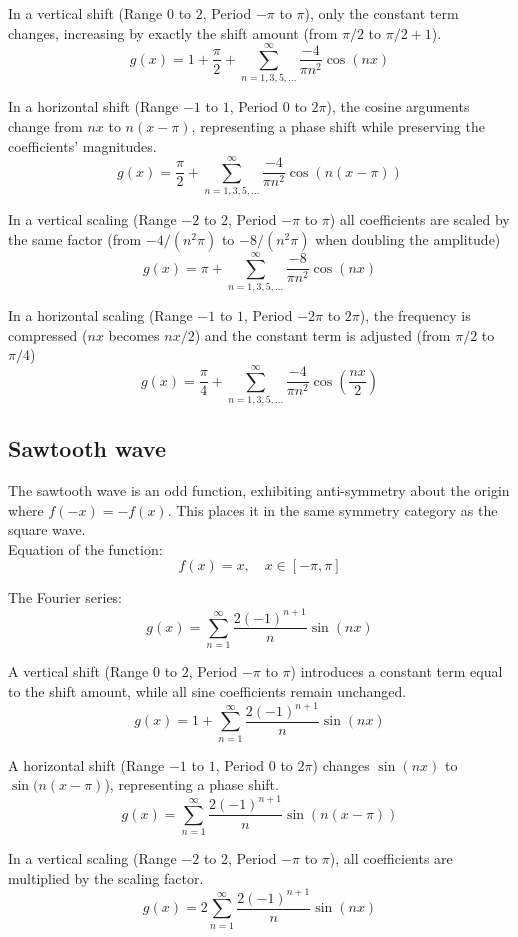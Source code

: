 \documentclass{article}
\begin{document}
In a vertical shift (Range $0$ to $2$, Period $-\pi$ to $\pi$), only the constant term changes, increasing by exactly the shift amount (from $\pi/2$ to $\pi/2 + 1$).
$$g(x) = 1 + \frac{\pi}{2} +\sum_{n=1,3,5,...}^{\infty}\frac{-4}{\pi n^2}\cos(nx)$$

In a horizontal shift (Range $-1$ to $1$, Period $0$ to $2\pi$), the cosine arguments change from $nx$ to $n(x-\pi)$, representing a phase shift while preserving the coefficients' magnitudes.
$$g(x) = \frac{\pi}{2} + \sum_{n=1,3,5,...}^{\infty}\frac{-4}{\pi n^2}\cos(n(x-\pi))$$

In a vertical scaling (Range $-2$ to $2$, Period $-\pi$ to $\pi$) all coefficients are scaled by the same factor (from $-4/(n^2\pi)$ to $-8/(n^2\pi)$ when doubling the amplitude)
$$g(x) = \pi + \sum_{n=1,3,5,...}^{\infty}\frac{-8}{\pi n^2}\cos(nx)$$

In a horizontal scaling (Range $-1$ to $1$, Period $-2\pi$ to $2\pi$), the frequency is compressed ($nx$ becomes $nx/2$) and the constant term is adjusted (from $\pi/2$ to $\pi/4$)
$$g(x) = \frac{\pi}{4} +\sum_{n=1,3,5,...}^{\infty}\frac{-4}{\pi n^2}\cos\left(\frac{nx}{2}\right)$$

\subsection{Sawtooth wave}

The sawtooth wave is an odd function, exhibiting anti-symmetry about the origin where $f(-x) = -f(x)$. This places it in the same symmetry category as the square wave.\\

Equation of the function:
\begin{equation}
f(x) = x, \quad x \in [-\pi, \pi]
\end{equation}

The Fourier series:
$$g(x) = \sum_{n=1}^{\infty} \frac{2(-1)^{n+1}}{n} \sin(nx)$$

A vertical shift (Range $0$ to $2$, Period $-\pi$ to $\pi$) introduces a constant term equal to the shift amount, while all sine coefficients remain unchanged.
$$g(x) = 1 + \sum_{n=1}^{\infty} \frac{2(-1)^{n+1}}{n} \sin(nx)$$

A horizontal shift (Range $-1$ to $1$, Period $0$ to $2\pi$) changes $\sin(nx)$ to $\sin(n(x-\pi)$), representing a phase shift.
$$g(x) = \sum_{n=1}^{\infty} \frac{2(-1)^{n+1}}{n} \sin(n(x-\pi))$$

In a vertical scaling (Range $-2$ to $2$, Period $-\pi$ to $\pi$), all coefficients are multiplied by the scaling factor.
$$g(x) = 2\sum_{n=1}^{\infty} \frac{2(-1)^{n+1}}{n} \sin(nx)$$
\end{document}
